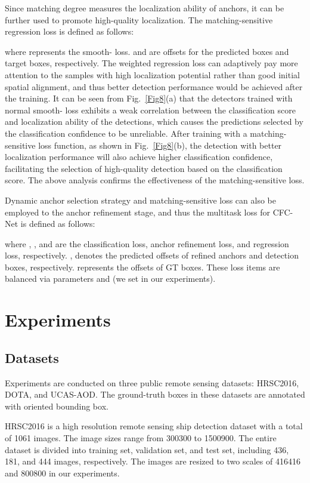 \documentclass[journal]{IEEEtran}
\begin{document}
Since matching degree measures the localization ability of anchors, it can be further used to promote high-quality localization. The matching-sensitive regression loss is defined as follows:


where  represents the smooth- loss\cite{girshick2015fast}.  and  are offsets for the predicted boxes and target boxes, respectively. The weighted regression loss can adaptively pay more attention to the samples with high localization potential rather than good initial spatial alignment, and thus better detection performance would be achieved after the training. It can be seen from Fig.~\ref{Fig8}(a) that the detectors trained with normal smooth- loss exhibits a weak correlation between the classification score and localization ability of the detections, which causes the predictions selected by the classification confidence to be unreliable. After training with a matching-sensitive loss function, as shown in Fig.~\ref{Fig8}(b), the detection with better localization performance will also achieve higher classification confidence, facilitating the selection of high-quality detection based on the classification score. The above analysis confirms the effectiveness of the matching-sensitive loss. 


Dynamic anchor selection strategy and matching-sensitive loss can also be employed to the anchor refinement stage, and thus the multitask loss for CFC-Net is defined as follows: 

where , , and  are the classification loss, anchor refinement loss, and regression loss, respectively. ,  denotes the predicted offsets of refined anchors and detection boxes, respectively.  represents the offsets of GT boxes. These loss items are balanced via parameters  and  (we set  in our experiments). 






\section{Experiments}

\subsection{Datasets}
Experiments are conducted on three public remote sensing datasets: HRSC2016, DOTA, and UCAS-AOD. The ground-truth boxes in these datasets are annotated with oriented bounding box.  

HRSC2016 \cite{liu2017high} is a high resolution remote sensing ship detection dataset with a total of 1061 images. The image sizes range from 300300 to 1500900. The entire dataset is divided into training set, validation set, and test set, including 436, 181, and 444 images, respectively. The images are resized to two scales of 416416 and 800800 in our experiments.
\end{document}
